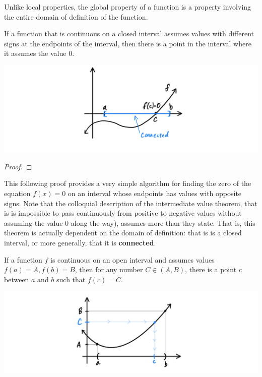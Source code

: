 \documentclass{article}
\begin{document}
    Unlike local properties, the global property of a function is a property involving the entire domain of definition of the function. 

    \begin{theorem}
    If a function that is continuous on a closed interval assumes values with different signs at the endpoints of the interval, then there is a point in the interval where it assumes the value $0$. 
    \begin{center}
        \includegraphics[scale=0.25]{img/IVT.PNG}
    \end{center}
    \end{theorem}
    \begin{proof}

    \end{proof}

    This following proof provides a very simple algorithm for finding the zero of the equation $f(x) = 0$ on an interval whose endpoints has values with opposite signs. 
    Note that the colloquial description of the intermediate value theorem, that is is impossible to pass continuously from positive to negative values without assuming the value $0$ along the way), assumes more than they state. That is, this theorem is actually dependent on the domain of definition: that is is a closed interval, or more generally, that it is \textbf{connected}. 

    \begin{corollary}
    If a function $f$ is continuous on an open interval and assumes values $f(a) = A, f(b) = B$, then for any number $C \in (A, B)$, there is a point $c$ between $a$ and $b$ such that $f(c) = C$. 
    \begin{center}
        \includegraphics[scale=0.25]{img/Corollary_of_IVT.PNG}
    \end{center}
    \end{corollary}
\end{document}
